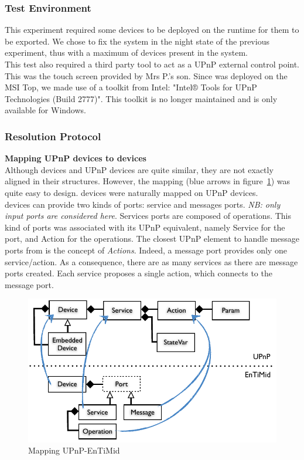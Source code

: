\subsubsection{Test Environment}

This experiment required some devices to be deployed on the runtime for them to be exported. We chose to fix the system in the night state of the previous experiment, thus with a maximum of devices present in the system.\\
This test also required a third party tool to act as a UPnP external control point. This was the touch screen provided by Mrs P.'s son. Since \enti{} was deployed on the MSI Top, we made use of a toolkit from Intel: "Intel® Tools for UPnP Technologies (Build 2777)". This toolkit is no longer maintained and is only available for Windows.

\subsubsection{Resolution Protocol}

{\bf Mapping UPnP devices to \enti{} devices}\\
Although \enti{} devices and UPnP devices are quite similar, they are not exactly aligned in their structures. However, the mapping (blue arrows in figure~\ref{fig:upnp-mapping}) was quite easy to design. \enti{} devices were naturally mapped on UPnP devices.\\
\enti{} devices can provide two kinds of ports: service and messages ports. {\it NB: only input ports are considered here}. Services ports are composed of operations. This kind of ports was associated with its UPnP equivalent, namely Service for the port, and Action for the operations. The closest UPnP element to handle message ports from \enti{} is the concept of {\it Actions}. Indeed, a message port provides only one service/action. As a consequence, there are as many services as there are message ports created. Each service proposes a single action, which connects to the message port.\\

\begin{figure}
\centering
\includegraphics[]{part4/pics/UPnPMapping}
\caption{Mapping UPnP-EnTiMid}
\label{fig:upnp-mapping}
\end{figure}

